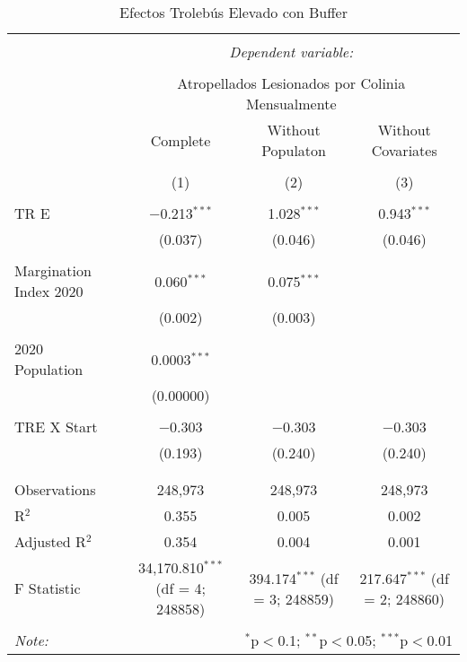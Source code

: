 
\begin{table}[!htbp] \centering 
  \caption{Efectos Trolebús Elevado con Buffer} 
  \label{} 
\begin{tabular}{@{\extracolsep{5pt}}lccc} 
\\[-1.8ex]\hline 
\hline \\[-1.8ex] 
 & \multicolumn{3}{c}{\textit{Dependent variable:}} \\ 
\cline{2-4} 
\\[-1.8ex] & \multicolumn{3}{c}{Atropellados Lesionados por Colinia Mensualmente} \\ 
 & Complete & Without Populaton & Without Covariates \\ 
\\[-1.8ex] & (1) & (2) & (3)\\ 
\hline \\[-1.8ex] 
 TR E & $-$0.213$^{***}$ & 1.028$^{***}$ & 0.943$^{***}$ \\ 
  & (0.037) & (0.046) & (0.046) \\ 
  & & & \\ 
 Margination Index 2020 & 0.060$^{***}$ & 0.075$^{***}$ &  \\ 
  & (0.002) & (0.003) &  \\ 
  & & & \\ 
 2020 Population & 0.0003$^{***}$ &  &  \\ 
  & (0.00000) &  &  \\ 
  & & & \\ 
 TRE X Start & $-$0.303 & $-$0.303 & $-$0.303 \\ 
  & (0.193) & (0.240) & (0.240) \\ 
  & & & \\ 
\hline \\[-1.8ex] 
Observations & 248,973 & 248,973 & 248,973 \\ 
R$^{2}$ & 0.355 & 0.005 & 0.002 \\ 
Adjusted R$^{2}$ & 0.354 & 0.004 & 0.001 \\ 
F Statistic & 34,170.810$^{***}$ (df = 4; 248858) & 394.174$^{***}$ (df = 3; 248859) & 217.647$^{***}$ (df = 2; 248860) \\ 
\hline 
\hline \\[-1.8ex] 
\textit{Note:}  & \multicolumn{3}{r}{$^{*}$p$<$0.1; $^{**}$p$<$0.05; $^{***}$p$<$0.01} \\ 
\end{tabular} 
\end{table} 
